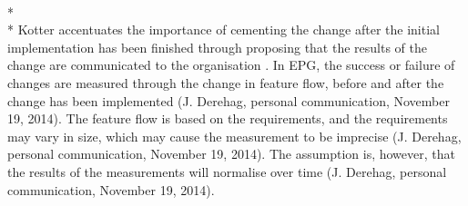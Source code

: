 \documentclass[final_report_innit.tex]{subfiles}
\begin{document}
\\* 
\\* 
Kotter accentuates the importance of cementing the change after the initial implementation has been finished through proposing that the results of the change are communicated to the organisation \cite{kotter1995leading}. In EPG, the success or failure of changes are measured through the change in feature flow, before and after the change has been implemented (J. Derehag, personal communication, November 19, 2014). The feature flow is based on the requirements, and the requirements may vary in size, which may cause the measurement to be imprecise (J. Derehag, personal communication, November 19, 2014). The assumption is, however, that the results of the measurements will normalise over time (J. Derehag, personal communication, November 19, 2014).   
\end{document}
